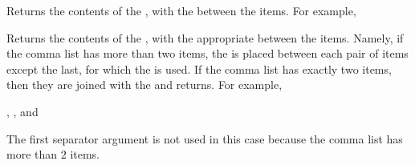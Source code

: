 \documentclass[oneside]{book}
\let\tn=\cs
\begin{document}
\begin{function}{\ClistVarJoin}
\begin{syntax}
  
\end{syntax}
Returns the contents of the ,
with the  between the items.
For example,
\begin{demohigh}
\ClistSet {}
\ClistVarJoin {}
\end{demohigh}
\end{function}

\begin{function}{\ClistVarJoinExtended}
\begin{syntax}
    
\end{syntax}
Returns the contents of the ,
with the appropriate  between the items. Namely, if
the comma list has more than two items, the  is placed between each pair of items except the
last, for which the  is used.  If
the comma list has exactly two items, then they are joined with
the  and returns.
For example,
\begin{demohigh}
\ClistSet {}
\ClistVarJoinExtended {} {, } {, and }
\end{demohigh}
The first separator argument is not used in this case
because the comma list has more than $2$ items.
\end{function}
\end{document}
